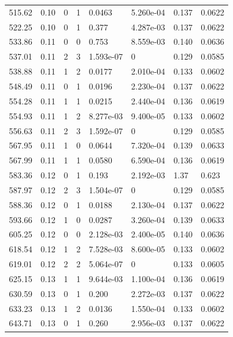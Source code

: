 \documentclass[preview]{standalone}
\begin{document}
{{{\begin{tabular}{L{1.2cm}C{1.2cm} C{0.3cm}C{0.5cm} C{1.4cm}C{1.4cm} C{1.4cm}C{1.4cm}}
  515.62  &  0.10  & 0     &  1 &  0.0463  & 5.260e-04  & 0.137 &  0.0622   \\ 
  522.25  &  0.10  & 0     &  1 &  0.377  & 4.287e-03  & 0.137 &  0.0622   \\ 
  533.86  &  0.11  & 0     &  0 &  0.753  & 8.559e-03  & 0.140 &  0.0636   \\ 
  537.01  &  0.11  & 2     &  3 &  1.593e-07  & 0  & 0.129 &  0.0585   \\ 
  538.88  &  0.11  & 1     &  2 &  0.0177  & 2.010e-04  & 0.133 &  0.0602   \\ 
  548.49  &  0.11  & 0     &  1 &  0.0196  & 2.230e-04  & 0.137 &  0.0622   \\ 
  554.28  &  0.11  & 1     &  1 &  0.0215  & 2.440e-04  & 0.136 &  0.0619   \\ 
  554.93  &  0.11  & 1     &  2 &  8.277e-03  & 9.400e-05  & 0.133 &  0.0602   \\ 
  556.63  &  0.11  & 2     &  3 &  1.592e-07  & 0  & 0.129 &  0.0585   \\ 
  567.95  &  0.11  & 1     &  0 &  0.0644  & 7.320e-04  & 0.139 &  0.0633   \\ 
  567.99  &  0.11  & 1     &  1 &  0.0580  & 6.590e-04  & 0.136 &  0.0619   \\ 
  583.36  &  0.12  & 0     &  1 &  0.193  & 2.192e-03  & 1.37 &  0.623   \\ 
  587.97  &  0.12  & 2     &  3 &  1.504e-07  & 0  & 0.129 &  0.0585   \\ 
  588.36  &  0.12  & 0     &  1 &  0.0188  & 2.130e-04  & 0.137 &  0.0622   \\ 
  593.66  &  0.12  & 1     &  0 &  0.0287  & 3.260e-04  & 0.139 &  0.0633   \\ 
  605.25  &  0.12  & 0     &  0 &  2.128e-03  & 2.400e-05  & 0.140 &  0.0636   \\ 
  618.54  &  0.12  & 1     &  2 &  7.528e-03  & 8.600e-05  & 0.133 &  0.0602   \\ 
  619.01  &  0.12  & 2     &  2 &  5.064e-07  & 0  & 0.133 &  0.0605   \\ 
  625.15  &  0.13  & 1     &  1 &  9.644e-03  & 1.100e-04  & 0.136 &  0.0619   \\ 
  630.59  &  0.13  & 0     &  1 &  0.200  & 2.272e-03  & 0.137 &  0.0622   \\ 
  633.23  &  0.13  & 1     &  2 &  0.0136  & 1.550e-04  & 0.133 &  0.0602   \\ 
  643.71  &  0.13  & 0     &  1 &  0.260  & 2.956e-03  & 0.137 &  0.0622   \\ 

\end{tabular}}}}
\end{document}
